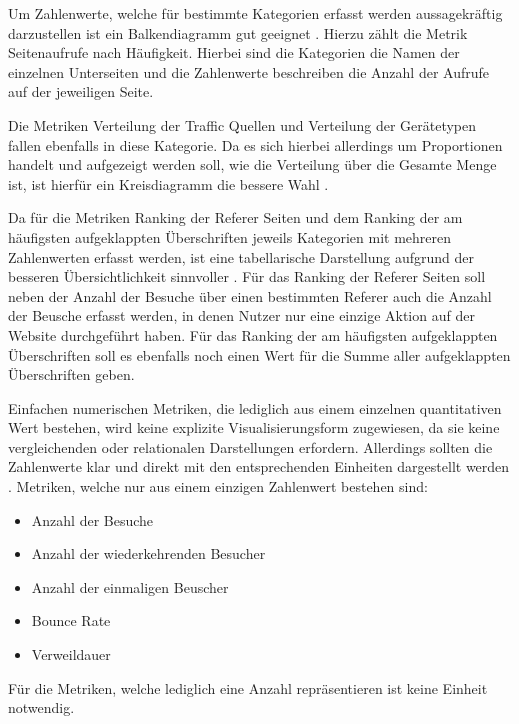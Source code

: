 Um Zahlenwerte, welche für bestimmte Kategorien erfasst werden aussagekräftig darzustellen ist ein Balkendiagramm gut geeignet \parencite[Kap.5]{Wilke}. Hierzu zählt die Metrik \glqq Seitenaufrufe nach Häufigkeit\grqq{}. Hierbei sind die Kategorien die Namen der einzelnen Unterseiten und die Zahlenwerte beschreiben die Anzahl der Aufrufe auf der jeweiligen Seite.

Die Metriken \glqq Verteilung der Traffic Quellen\grqq{} und \glqq Verteilung der Gerätetypen\grqq{} fallen ebenfalls in diese Kategorie. Da es sich hierbei allerdings um Proportionen handelt und aufgezeigt werden soll, wie die Verteilung über die Gesamte Menge ist, ist hierfür ein Kreisdiagramm die bessere Wahl \parencite[Kap.5]{Wilke}.

Da für die Metriken \glqq Ranking der Referer Seiten\grqq{} und dem \glqq Ranking der am häufigsten aufgeklappten Überschriften\grqq{} jeweils Kategorien mit mehreren Zahlenwerten erfasst werden, ist eine tabellarische Darstellung aufgrund der besseren Übersichtlichkeit sinnvoller \parencite{Auditrium}. Für das \glqq Ranking der Referer Seiten\grqq{} soll neben der Anzahl der Besuche über einen bestimmten Referer auch die Anzahl der Beusche erfasst werden, in denen Nutzer nur eine einzige Aktion auf der Website durchgeführt haben. Für das \glqq Ranking der am häufigsten aufgeklappten Überschriften\grqq{} soll es ebenfalls noch einen Wert für die Summe aller aufgeklappten Überschriften geben.

Einfachen numerischen Metriken, die lediglich aus einem einzelnen quantitativen Wert bestehen, wird keine explizite Visualisierungsform zugewiesen, da sie keine vergleichenden oder relationalen Darstellungen erfordern. Allerdings sollten die Zahlenwerte klar und direkt mit den entsprechenden Einheiten dargestellt werden \parencite[Kap.22]{Wilke}. Metriken, welche nur aus einem einzigen Zahlenwert bestehen sind: 

\begin{itemize}
    \item \glqq Anzahl der Besuche\grqq{}
    \item \glqq Anzahl der wiederkehrenden Besucher\grqq{}
    \item \glqq Anzahl der einmaligen Beuscher\grqq{}
    \item \glqq Bounce Rate\grqq{}
    \item \glqq Verweildauer\grqq{}
\end{itemize}

Für die Metriken, welche lediglich eine Anzahl repräsentieren ist keine Einheit notwendig.

